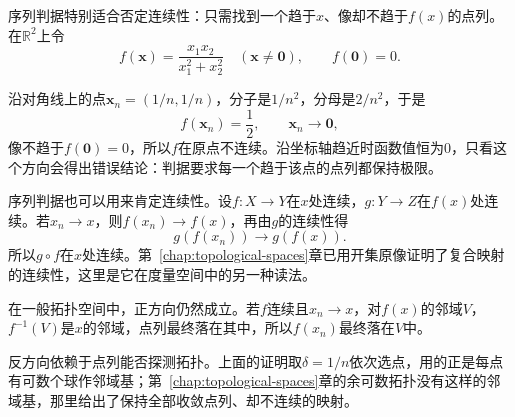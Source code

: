 序列判据特别适合否定连续性：只需找到一个趋于$x$、像却不趋于$f(x)$的点列。在$\mathbb R^2$上令
\[
 f(\bm x)=\frac{x_1x_2}{x_1^2+x_2^2}\quad(\bm x\neq\bm 0),\qquad f(\bm 0)=0.
\]

沿对角线上的点$\bm x_n=(1/n,1/n)$，分子是$1/n^2$，分母是$2/n^2$，于是
\[
 f(\bm x_n)=\frac12,\qquad \bm x_n\to\bm 0,
\]
像不趋于$f(\bm 0)=0$，所以$f$在原点不连续。沿坐标轴趋近时函数值恒为$0$，只看这个方向会得出错误结论：判据要求每一个趋于该点的点列都保持极限。

序列判据也可以用来肯定连续性。设$f:X\to Y$在$x$处连续，$g:Y\to Z$在$f(x)$处连续。若$x_n\to x$，则$f(x_n)\to f(x)$，再由$g$的连续性得
\[
 g(f(x_n))\to g(f(x)).
\]
所以$g\circ f$在$x$处连续。第~\ref{chap:topological-spaces}章已用开集原像证明了复合映射的连续性，这里是它在度量空间中的另一种读法。

在一般拓扑空间中，正方向仍然成立。若$f$连续且$x_n\to x$，对$f(x)$的邻域$V$，$f^{-1}(V)$是$x$的邻域，点列最终落在其中，所以$f(x_n)$最终落在$V$中。

反方向依赖于点列能否探测拓扑。上面的证明取$\delta=1/n$依次选点，用的正是每点有可数个球作邻域基；第~\ref{chap:topological-spaces}章的余可数拓扑没有这样的邻域基，那里给出了保持全部收敛点列、却不连续的映射。
